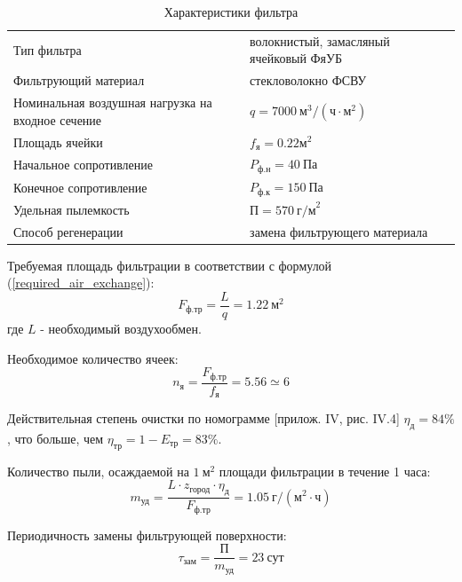 \begin{table}[ht]
    \centering
    \begin{tabu}{X[l,m]|X[l,m]}
        \hline
        Тип фильтра                                         & волокнистый, замасляный ячейковый ФяУБ            \\
        Фильтрующий материал                                & стекловолокно ФСВУ                                \\
        Номинальная воздушная нагрузка на входное сечение   & $q = 7000 ~\text{м}^3/(\text{ч} \cdot \text{м}^2)$\\
        Площадь ячейки                                      & $f_\text{я} = 0.22 \text{м}^2 $                   \\
        Начальное сопротивление                             & $P_\text{ф.н} = 40 ~\text{Па}$                    \\
        Конечное сопротивление                              & $P_\text{ф.к} = 150 ~\text{Па}$                   \\
        Удельная пылемкость                                 & $\text{П} = 570 ~\text{г/м}^2$                    \\
        Способ регенерации                                  & замена фильтрующего материала                     \\
        \hline
    \end{tabu}
    \caption{Характеристики фильтра}
\end{table}

Требуемая площадь фильтрации в соответствии с формулой (\ref{required_air_exchange}):
$$
    F_\text{ф.тр} = \frac{L}{q} = 1.22 ~\text{м}^2
$$
где $L$ - необходимый воздухообмен.

Необходимое количество ячеек:
$$
    n_\text{я} =    \frac{F_\text{ф.тр}}{f_\text{я}} = 5.56
                    \simeq 6
$$

Действительная степень очистки по номограмме
\cite{air_ventilation_and_conditioning}[прилож. IV, рис. IV.4] $\eta_\text{д} = 84 \%$, что
больше, чем $\eta_\text{тр} = 1 - E_\text{тр} = 83 \%$.

Количество пыли, осаждаемой на $1 ~\text{м}^2$ площади фильтрации в течение 1 часа:
$$
    m_\text{уд} = \frac{L \cdot z_\text{город} \cdot \eta_\text{д}}{F_\text{ф.тр}}
            = 1.05 ~\text{г/}(\text{м}^2 \cdot \text{ч})
$$

Периодичность замены фильтрующей поверхности:
$$
    \tau_\text{зам} = \frac{\text{П}}{m_\text{уд}} = 23 ~\text{сут}
$$

